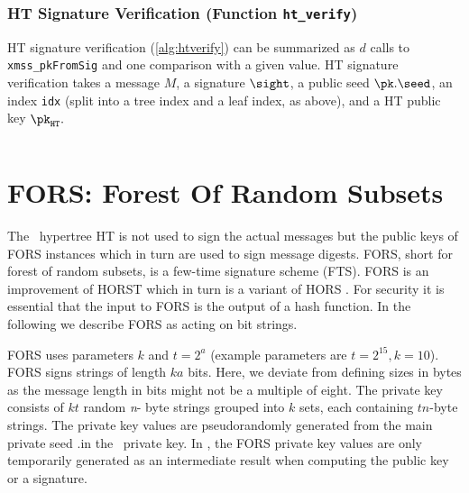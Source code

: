 \begin{algorithm}
    \inputminted[breaklines,linenos,tabsize=2,mathescape,escapeinside=||]{C}{code/ht_sign.cs}
    \caption{\texttt{ht\_sign} --- Generating an HT signature.}
    \label{alg:htsign}
\end{algorithm}

\subsubsection{HT Signature Verification (Function \texttt{ht\_verify})}

HT signature verification (\cref{alg:htverify}) can be summarized as $d$ calls to \texttt{xmss\_pkFromSig} and one comparison with a given value. HT signature verification takes a message $M$, a signature $\sight$, a public seed $\pk.\seed$, an index \texttt{idx} (split into a tree index and a leaf index, as above), and a HT public key $\pk_{\mathtt{HT}}.$

\begin{algorithm}
    \inputminted[breaklines,linenos,tabsize=2,mathescape,escapeinside=||]{C}{code/ht_verify.cs}
    \caption{\texttt{ht\_verify} --- Verifying a HT signature $\bf {SIG}_{HT}$ on a message $M$ using a HT public key ${\bf PK}_{HT}$.}
    \label{alg:htverify}
\end{algorithm}
\section{FORS: Forest Of Random Subsets}
\label{sec:fors}

The \SPHINCSA\ hypertree HT is not used to sign the actual messages but the public keys of FORS instances which in turn are used to sign message digests. FORS, short for forest of random subsets, is a few-time signature scheme (FTS). FORS is an improvement of HORST \cite{EC:BHHLNP15} which in turn is a variant of HORS \cite{EPRINT:ReyRey02}. For security it is essential that the input to FORS is the output of a hash function. In the following we describe FORS as acting on bit strings.

FORS uses parameters $k$ and $t=2^{a}$ (example parameters are $t=2^{15}, k=10$). FORS signs strings of length $ka$ bits. Here, we deviate from defining sizes in bytes as the message length in bits might not be a multiple of eight. The private key consists of $kt$ random {\it n}- byte strings grouped into $k$ sets, each containing $t n$-byte strings. The private key values are pseudorandomly generated from the main private seed \sk.\seed in the \SPHINCSA\ private key. In \SPHINCSA, the FORS private key values are only temporarily generated as an intermediate result when computing the public key or a signature.

